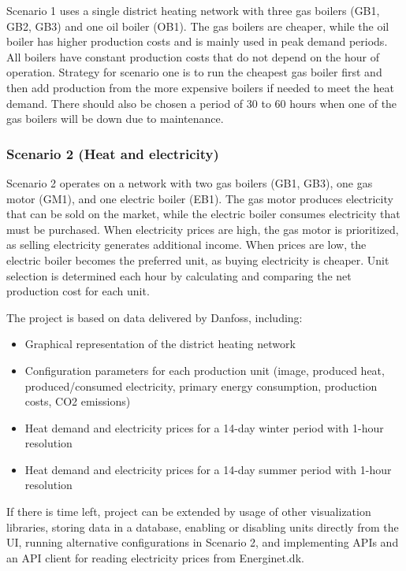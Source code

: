 \hspace*{1cm}Scenario 1 uses a single district heating network with three gas boilers (GB1, GB2, GB3) and one oil boiler (OB1). The gas boilers are cheaper, while the oil boiler has higher production costs and is mainly used in peak demand periods. All boilers have constant production costs that do not depend on the hour of operation. Strategy for scenario one is to run the cheapest gas boiler first and then add production from the more expensive boilers if needed to meet the heat demand. There should also be chosen a period of 30 to 60 hours when one of the gas boilers will be down due to maintenance.

\subsubsection*{Scenario 2 (Heat and electricity)}

\hspace*{1cm}Scenario 2 operates on a network with two gas boilers (GB1, GB3), one gas motor (GM1), and one electric boiler (EB1). The gas motor produces electricity that can be sold on the market, while the electric boiler consumes electricity that must be purchased.
When electricity prices are high, the gas motor is prioritized, as selling electricity generates additional income. When prices are low, the electric boiler becomes the preferred unit, as buying electricity is cheaper. Unit selection is determined each hour by calculating and comparing the net production cost for each unit.


The project is based on data delivered by Danfoss, including:

\begin{itemize}
    \item Graphical representation of the district heating network
    \item Configuration parameters for each production unit (image, produced heat, produced/consumed electricity, primary energy consumption, production costs, CO2 emissions)
    \item Heat demand and electricity prices for a 14-day winter period with 1-hour resolution
    \item Heat demand and electricity prices for a 14-day summer period with 1-hour resolution
\end{itemize}

\medskip

\hspace*{1cm}If there is time left,  project can be extended by usage of other visualization libraries, storing data in a database, enabling or disabling units directly from the UI, running alternative configurations in Scenario 2, and implementing APIs and an API client for reading electricity prices from Energinet.dk.

